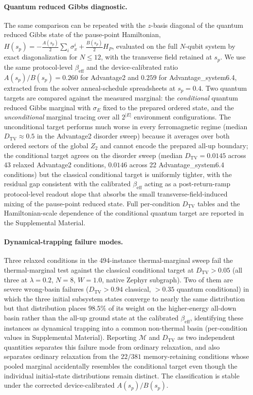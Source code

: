 \paragraph{Quantum reduced Gibbs diagnostic.}
The same comparison can be repeated with the $z$-basis diagonal of the
quantum reduced Gibbs state of the pause-point Hamiltonian,
$H(s_p) = -\tfrac{A(s_p)}{2}\sum_i \sigma_x^i + \tfrac{B(s_p)}{2} H_P$,
evaluated on the full $N$-qubit system by exact diagonalization for
$N\le12$, with the transverse field retained at $s_p$.  We use the same
protocol-level $\beta_\mathrm{eff}$ and the device-calibrated ratio
$A(s_p)/B(s_p)=0.260$ for Advantage2 and $0.259$ for
Advantage\_system6.4, extracted from the solver anneal-schedule
spreadsheets at $s_p=0.4$.  Two quantum targets are compared against the
measured marginal: the \emph{conditional} quantum reduced Gibbs marginal
with $\sigma_E$ fixed to the prepared ordered state, and the
\emph{unconditional} marginal tracing over all $2^{|E|}$ environment
configurations.
The unconditional target performs much worse in every ferromagnetic
regime (median $D_\mathrm{TV}\approx 0.5$ in the Advantage2 disorder
sweep) because it averages over both ordered sectors of the global $Z_2$
and cannot encode the prepared all-up boundary; the conditional target
agrees on the disorder sweep (median $D_\mathrm{TV}=0.0145$ across 43
relaxed Advantage2 conditions, $0.0146$ across 22 Advantage\_system6.4
conditions) but the classical conditional target is uniformly tighter,
with the residual gap consistent with the calibrated $\beta_\mathrm{eff}$
acting as a post-return-ramp protocol-level readout slope that absorbs
the small transverse-field-induced mixing of the pause-point reduced
state.  Full per-condition $D_\mathrm{TV}$ tables and the
Hamiltonian-scale dependence of the conditional quantum target are
reported in the Supplemental Material.

\paragraph{Dynamical-trapping failure modes.}
Three relaxed conditions in the 494-instance thermal-marginal sweep fail
the thermal-marginal test against the classical conditional target at
$D_\mathrm{TV}>0.05$ (all three at $\lambda=0.2$, $N=8$, $W=1.0$, native
Zephyr subgraph).  Two of them are severe wrong-basin failures
($D_\mathrm{TV}>0.94$ classical, $>0.35$ quantum conditional) in which
the three initial subsystem states converge to nearly the same
distribution but that distribution places $98.5\%$ of its weight on the
higher-energy all-down basin rather than the all-up ground state at the
calibrated $\beta_\mathrm{eff}$, identifying these instances as dynamical
trapping into a common non-thermal basin (per-condition values in
Supplemental Material).
Reporting $\mathcal{M}$ and $D_\mathrm{TV}$ as two independent quantities
separates this failure mode from ordinary relaxation, and also
separates ordinary relaxation from the $22/381$ memory-retaining
conditions whose pooled marginal accidentally resembles the conditional
target even though the individual initial-state distributions remain
distinct.  The classification is stable under the corrected
device-calibrated $A(s_p)/B(s_p)$.

